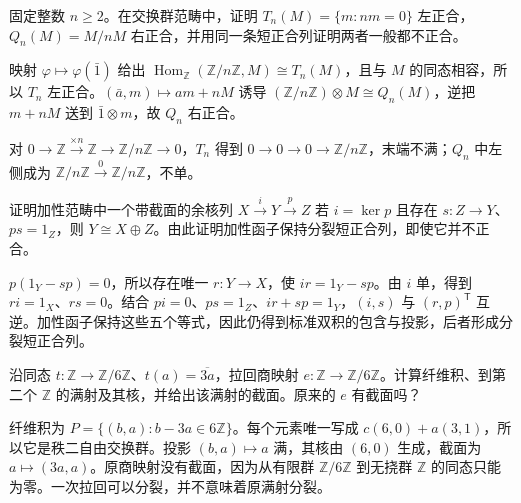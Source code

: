 \begin{exercise}\label{b4:ex:04-torsion-and-quotient}
	固定整数 \(n\geq2\)。在交换群范畴中，证明 \(T_n(M)=\{m:nm=0\}\) 左正合，\(Q_n(M)=M/nM\) 右正合，并用同一条短正合列证明两者一般都不正合。
\end{exercise}
\begin{solution}
	映射 \(\varphi\mapsto\varphi(\bar1)\) 给出 \(\operatorname{Hom}_{\mathbb Z}(\mathbb Z/n\mathbb Z,M)\cong T_n(M)\)，且与 \(M\) 的同态相容，所以 \(T_n\) 左正合。\((\bar a,m)\mapsto am+nM\) 诱导 \((\mathbb Z/n\mathbb Z)\otimes M\cong Q_n(M)\)，逆把 \(m+nM\) 送到 \(\bar1\otimes m\)，故 \(Q_n\) 右正合。

	对 \(0\to\mathbb Z\xrightarrow{\times n}\mathbb Z\to\mathbb Z/n\mathbb Z\to0\)，\(T_n\) 得到 \(0\to0\to0\to\mathbb Z/n\mathbb Z\)，末端不满；\(Q_n\) 中左侧成为 \(\mathbb Z/n\mathbb Z\xrightarrow0\mathbb Z/n\mathbb Z\)，不单。
\end{solution}

\begin{exercise}\label{b4:ex:04-split-sequence-functor}
	证明加性范畴中一个带截面的余核列 \(X\xrightarrow iY\xrightarrow pZ\) 若 \(i=\ker p\) 且存在 \(s:Z\to Y\)、\(ps=1_Z\)，则 \(Y\cong X\oplus Z\)。由此证明加性函子保持分裂短正合列，即使它并不正合。
\end{exercise}
\begin{solution}
	\(p(1_Y-sp)=0\)，所以存在唯一 \(r:Y\to X\)，使 \(ir=1_Y-sp\)。由 \(i\) 单，得到 \(ri=1_X\)、\(rs=0\)。结合 \(pi=0\)、\(ps=1_Z\)、\(ir+sp=1_Y\)，\((i,s)\) 与 \((r,p)^{\mathsf T}\) 互逆。加性函子保持这些五个等式，因此仍得到标准双积的包含与投影，后者形成分裂短正合列。
\end{solution}

\begin{exercise}\label{b4:ex:04-explicit-pullback}
	沿同态 \(t:\mathbb Z\to\mathbb Z/6\mathbb Z\)、\(t(a)=\overline{3a}\)，拉回商映射 \(e:\mathbb Z\to\mathbb Z/6\mathbb Z\)。计算纤维积、到第二个 \(\mathbb Z\) 的满射及其核，并给出该满射的截面。原来的 \(e\) 有截面吗？
\end{exercise}
\begin{solution}
	纤维积为 \(P=\{(b,a):b-3a\in6\mathbb Z\}\)。每个元素唯一写成 \(c(6,0)+a(3,1)\)，所以它是秩二自由交换群。投影 \((b,a)\mapsto a\) 满，其核由 \((6,0)\) 生成，截面为 \(a\mapsto(3a,a)\)。原商映射没有截面，因为从有限群 \(\mathbb Z/6\mathbb Z\) 到无挠群 \(\mathbb Z\) 的同态只能为零。一次拉回可以分裂，并不意味着原满射分裂。
\end{solution}

